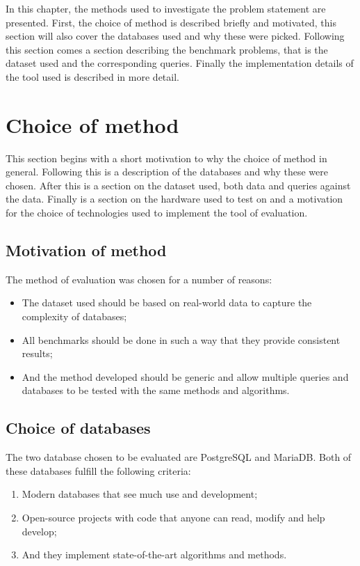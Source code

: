 In this chapter, the methods used to investigate the problem statement are
presented. First, the choice of method is described briefly and motivated, this
section will also cover the databases used and why these were picked. Following
this section comes a section describing the benchmark problems, that is the
dataset used and the corresponding queries. Finally the implementation details
of the tool used is described in more detail.

\section{Choice of method}\label{sec:choiceofmethod}
This section begins with a short motivation to why the choice of method in
general. Following this is a description of the databases and why these were
chosen. After this is a section on the dataset used, both data and queries
against the data. Finally is a section on the hardware used to test on and a
motivation for the choice of technologies used to implement the tool of evaluation.

\subsection{Motivation of method}
The method of evaluation was chosen for a number of reasons:
\begin{itemize}
\item The dataset used should be based on real-world data to capture the
  complexity of databases;
\item All benchmarks should be done in such a way that they provide consistent
  results;
\item And the method developed should be generic and allow multiple queries and
  databases to be tested with the same methods and algorithms.
\end{itemize}

\subsection{Choice of databases}\label{sec:choiceofdatabases}
The two database chosen to be evaluated are PostgreSQL and MariaDB.
Both of these databases fulfill the following criteria:
\begin{enumerate}
\item Modern databases that see much use and development;
\item Open-source projects with code that anyone can read, modify and help develop;
\item And they implement state-of-the-art algorithms and methods.
\end{enumerate}

